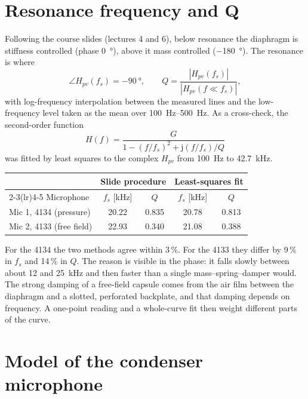 \documentclass[a4paper,10pt]{article}
\begin{document}
\section{Resonance frequency and Q}
Following the course slides (lectures 4 and 6), below resonance the diaphragm is
stiffness controlled (phase \SI{0}{\degree}), above it mass controlled
(\SI{-180}{\degree}). The resonance is where
\begin{equation}
\angle H_{pv}(f_s) = \SI{-90}{\degree},\qquad
Q=\frac{|H_{pv}(f_s)|}{|H_{pv}(f\ll f_s)|},
\end{equation}
with log-frequency interpolation between the measured lines and the low-frequency level
taken as the mean over \SI{100}{\hertz}--\SI{500}{\hertz}. As a cross-check, the
second-order function
\begin{equation}
H(f)=\frac{G}{1-(f/f_s)^2+\mathrm{j}(f/f_s)/Q}
\end{equation}
was fitted by least squares to the complex $H_{pv}$ from \SI{100}{\hertz} to
\SI{42.7}{\kilo\hertz}.

\begin{table}[H]\centering
\begin{tabular}{lcccc}\toprule
& \multicolumn{2}{c}{Slide procedure} & \multicolumn{2}{c}{Least-squares fit}\\
\cmidrule(lr){2-3}\cmidrule(lr){4-5}
Microphone & $f_s$ [kHz] & $Q$ & $f_s$ [kHz] & $Q$\\\midrule
Mic 1, 4134 (pressure) & 20.22 & 0.835 & 20.78 & 0.813\\
Mic 2, 4133 (free field) & 22.93 & 0.340 & 21.08 & 0.388\\\bottomrule
\end{tabular}
\end{table}

For the 4134 the two methods agree within 3\,\%. For the 4133 they differ by 9\,\% in
$f_s$ and 14\,\% in $Q$. The reason is visible in the phase: it falls slowly between
about 12 and \SI{25}{\kilo\hertz} and then faster than a single mass--spring--damper
would. The strong damping of a free-field capsule comes
from the air film between the diaphragm and a slotted, perforated backplate, and that
damping depends on frequency. A one-point reading and a whole-curve fit then weight
different parts of the curve.

\section{Model of the condenser microphone}
\end{document}
